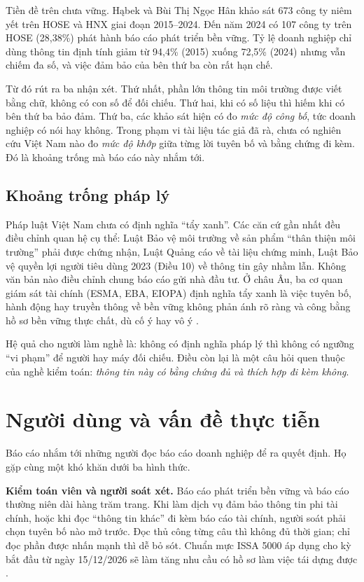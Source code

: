 Tiền đề trên chưa vững. Hąbek và Bùi Thị Ngọc Hân \cite{habek2025} khảo sát 673 công ty niêm yết trên HOSE và HNX giai đoạn 2015–2024. Đến năm 2024 có 107 công ty trên HOSE (28,38\%) phát hành báo cáo phát triển bền vững. Tỷ lệ doanh nghiệp chỉ dùng thông tin định tính giảm từ 94,4\% (2015) xuống 72,5\% (2024) nhưng vẫn chiếm đa số, và việc đảm bảo của bên thứ ba còn rất hạn chế.

Từ đó rút ra ba nhận xét. Thứ nhất, phần lớn thông tin môi trường được viết bằng chữ, không có con số để đối chiếu. Thứ hai, khi có số liệu thì hiếm khi có bên thứ ba bảo đảm. Thứ ba, các khảo sát hiện có đo \emph{mức độ công bố}, tức doanh nghiệp có nói hay không. Trong phạm vi tài liệu tác giả đã rà, chưa có nghiên cứu Việt Nam nào đo \emph{mức độ khớp} giữa từng lời tuyên bố và bằng chứng đi kèm. Đó là khoảng trống mà báo cáo này nhắm tới.

\subsection{Khoảng trống pháp lý}

Pháp luật Việt Nam chưa có định nghĩa “tẩy xanh”. Các căn cứ gần nhất đều điều chỉnh quan hệ cụ thể: Luật Bảo vệ môi trường về sản phẩm “thân thiện môi trường” phải được chứng nhận, Luật Quảng cáo về tài liệu chứng minh, Luật Bảo vệ quyền lợi người tiêu dùng 2023 (Điều 10) về thông tin gây nhầm lẫn. Không văn bản nào điều chỉnh chung báo cáo gửi nhà đầu tư. Ở châu Âu, ba cơ quan giám sát tài chính (ESMA, EBA, EIOPA) định nghĩa tẩy xanh là việc tuyên bố, hành động hay truyền thông về bền vững không phản ánh rõ ràng và công bằng hồ sơ bền vững thực chất, dù cố ý hay vô ý \cite{esas2024}.

Hệ quả cho người làm nghề là: không có định nghĩa pháp lý thì không có ngưỡng “vi phạm” để người hay máy đối chiếu. Điều còn lại là một câu hỏi quen thuộc của nghề kiểm toán: \emph{thông tin này có bằng chứng đủ và thích hợp đi kèm không}.

\section{Người dùng và vấn đề thực tiễn}

Báo cáo nhắm tới những người đọc báo cáo doanh nghiệp để ra quyết định. Họ gặp cùng một khó khăn dưới ba hình thức.

\textbf{Kiểm toán viên và người soát xét.} Báo cáo phát triển bền vững và báo cáo thường niên dài hàng trăm trang. Khi làm dịch vụ đảm bảo thông tin phi tài chính, hoặc khi đọc “thông tin khác” đi kèm báo cáo tài chính, người soát phải chọn tuyên bố nào mở trước. Đọc thủ công từng câu thì không đủ thời gian; chỉ đọc phần được nhấn mạnh thì dễ bỏ sót. Chuẩn mực ISSA 5000 áp dụng cho kỳ bắt đầu từ ngày 15/12/2026 sẽ làm tăng nhu cầu có hồ sơ làm việc tái dựng được \cite{issa5000}.

